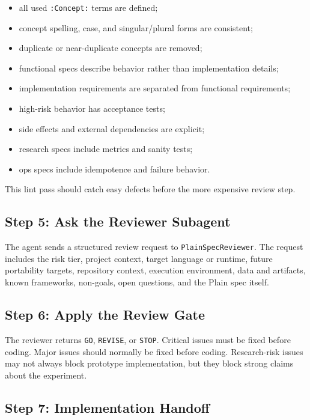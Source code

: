 \documentclass[11pt]{article}
\begin{document}
\begin{itemize}[nosep]
\item all used \texttt{:Concept:} terms are defined;
\item concept spelling, case, and singular/plural forms are consistent;
\item duplicate or near-duplicate concepts are removed;
\item functional specs describe behavior rather than implementation details;
\item implementation requirements are separated from functional requirements;
\item high-risk behavior has acceptance tests;
\item side effects and external dependencies are explicit;
\item research specs include metrics and sanity tests;
\item ops specs include idempotence and failure behavior.
\end{itemize}

This lint pass should catch easy defects before the more expensive review step.

\subsection{Step 5: Ask the Reviewer Subagent}

The agent sends a structured review request to \texttt{PlainSpecReviewer}. The
request includes the risk tier, project context, target language or runtime,
future portability targets, repository context, execution environment, data and
artifacts, known frameworks, non-goals, open questions, and the Plain spec itself.

\subsection{Step 6: Apply the Review Gate}

The reviewer returns \texttt{GO}, \texttt{REVISE}, or \texttt{STOP}. Critical
issues must be fixed before coding. Major issues should normally be fixed before
coding. Research-risk issues may not always block prototype implementation, but
they block strong claims about the experiment.

\subsection{Step 7: Implementation Handoff}
\end{document}

